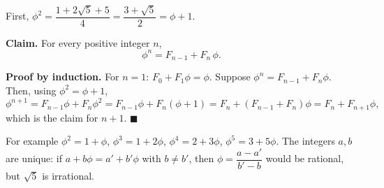 First, $\phi^2=\dfrac{1+2\sqrt5+5}{4}=\dfrac{3+\sqrt5}{2}=\phi+1$.

\textbf{Claim.} For every positive integer $n$,
\[\boxed{\phi^n=F_{n-1}+F_n\,\phi}.\]

\textbf{Proof by induction.} For $n=1$: $F_0+F_1\phi=\phi$. Suppose $\phi^n=F_{n-1}+F_n\phi$. Then, using $\phi^2=\phi+1$,
\[\phi^{n+1}=F_{n-1}\phi+F_n\phi^2=F_{n-1}\phi+F_n(\phi+1)=F_n+(F_{n-1}+F_n)\phi=F_n+F_{n+1}\phi,\]
which is the claim for $n+1$. $\blacksquare$

For example $\phi^2=1+\phi$, $\phi^3=1+2\phi$, $\phi^4=2+3\phi$, $\phi^5=3+5\phi$. The integers $a,b$ are unique: if $a+b\phi=a'+b'\phi$ with $b\ne b'$, then $\phi=\dfrac{a-a'}{b'-b}$ would be rational, but $\sqrt5$ is irrational.
